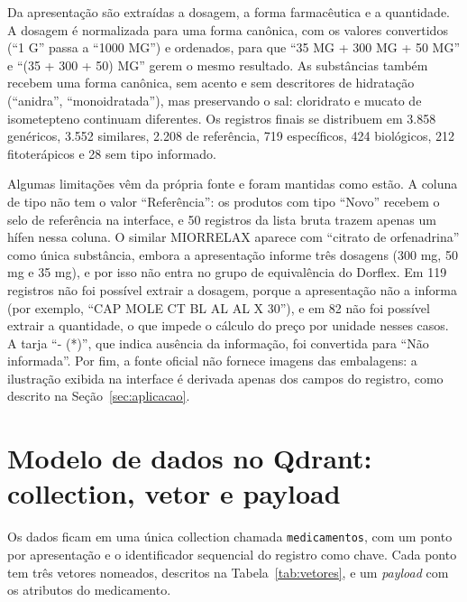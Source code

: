 \documentclass[12pt,oneside,a4paper,english,brazil]{abntex2}
\newcommand{\campo}[1]{\texttt{#1}}
\begin{document}
Da apresentação são extraídas a dosagem, a forma farmacêutica e a quantidade. A dosagem é normalizada para uma forma canônica, com os valores convertidos (``1 G'' passa a ``1000 MG'') e ordenados, para que ``35 MG + 300 MG + 50 MG'' e ``(35 + 300 + 50) MG'' gerem o mesmo resultado. As substâncias também recebem uma forma canônica, sem acento e sem descritores de hidratação (``anidra'', ``monoidratada''), mas preservando o sal: cloridrato e mucato de isometepteno continuam diferentes. Os registros finais se distribuem em 3.858 genéricos, 3.552 similares, 2.208 de referência, 719 específicos, 424 biológicos, 212 fitoterápicos e 28 sem tipo informado.

Algumas limitações vêm da própria fonte e foram mantidas como estão. A coluna de tipo não tem o valor ``Referência'': os produtos com tipo ``Novo'' recebem o selo de referência na interface, e 50 registros da lista bruta trazem apenas um hífen nessa coluna. O similar MIORRELAX aparece com ``citrato de orfenadrina'' como única substância, embora a apresentação informe três dosagens (300 mg, 50 mg e 35 mg), e por isso não entra no grupo de equivalência do Dorflex. Em 119 registros não foi possível extrair a dosagem, porque a apresentação não a informa (por exemplo, ``CAP MOLE CT BL AL AL X 30''), e em 82 não foi possível extrair a quantidade, o que impede o cálculo do preço por unidade nesses casos. A tarja ``- (*)'', que indica ausência da informação, foi convertida para ``Não informada''. Por fim, a fonte oficial não fornece imagens das embalagens: a ilustração exibida na interface é derivada apenas dos campos do registro, como descrito na Seção~\ref{sec:aplicacao}.

\section{Modelo de dados no Qdrant: collection, vetor e payload}

Os dados ficam em uma única collection chamada \campo{medicamentos}, com um ponto por apresentação e o identificador sequencial do registro como chave. Cada ponto tem três vetores nomeados, descritos na Tabela~\ref{tab:vetores}, e um \emph{payload} com os atributos do medicamento.
\end{document}
